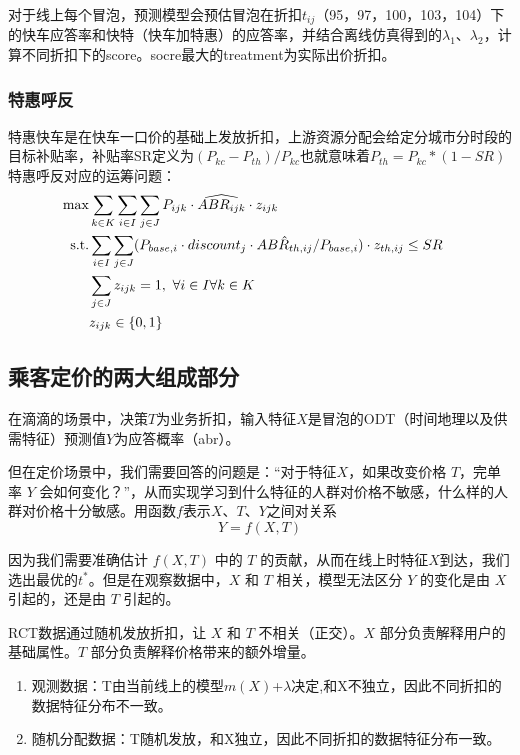 \documentclass[12pt, a4paper]{article}
\begin{document}
对于线上每个冒泡，预测模型会预估冒泡在折扣$t_{ij}$（95，97，100，103，104）下的快车应答率和快特（快车加特惠）的应答率，并结合离线仿真得到的$\lambda_1$、$\lambda_2$，计算不同折扣下的score。socre最大的treatment为实际出价折扣。
\subsubsection{特惠呼反}
特惠快车是在快车一口价的基础上发放折扣，上游资源分配会给定分城市分时段的目标补贴率，补贴率SR定义为$(P_{kc}-P_{th})/P_{kc}$也就意味着$P_{th}=P_{kc}*(1-SR)$
特惠呼反对应的运筹问题：
\begin{equation} 
\begin{aligned}
\max  & \sum_{k \in K}\sum_{i \in I}\sum_{j \in J} P_{ijk} \cdot \widehat{ABR_{ijk}} \cdot z_{ijk} \\
{\rm s.t.} & \sum_{i \in I}\sum_{j \in J} (P_{base,i} \cdot discount_{j}\cdot\hat{ABR_{th,ij}} /P_{base,i} )\cdot z_{th,ij} \leq SR  \\
& \sum_{j \in J} z_{ijk}  = 1, \  \forall i \in I \forall k \in K  &\\
& z_{ijk} \in \{0,1\}  
\end{aligned}
\end{equation} 



\subsection{乘客定价的两大组成部分}
在滴滴的场景中，决策$T$为业务折扣，输入特征$X$是冒泡的ODT（时间地理以及供需特征）预测值$Y$为应答概率（abr）。\par
但在定价场景中，我们需要回答的问题是：“对于特征$X$，如果改变价格 $T$，完单率 $Y$ 会如何变化？”，从而实现学习到什么特征的人群对价格不敏感，什么样的人群对价格十分敏感。用函数$f$表示$X$、$T$、$Y$之间对关系
$$Y = f(X, T)$$\par
因为我们需要准确估计 $f(X, T)$ 中的 $T$ 的贡献，从而在线上时特征$X$到达，我们选出最优的$t^*$。但是在观察数据中，$X$ 和 $T$ 相关，模型无法区分 $Y$ 的变化是由 $X$ 引起的，还是由 $T$ 引起的。\par
RCT数据通过随机发放折扣，让 $X$ 和 $T$ 不相关（正交）。$X$ 部分负责解释用户的基础属性。$T$ 部分负责解释价格带来的额外增量。

\begin{enumerate}
    \item 观测数据：T由当前线上的模型$m(X)$+$\lambda$决定,和X不独立，因此不同折扣的数据特征分布不一致。
    \item 随机分配数据：T随机发放，和X独立，因此不同折扣的数据特征分布一致。
\end{enumerate}
\end{document}

